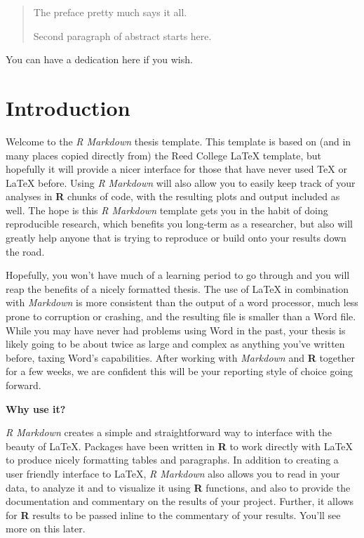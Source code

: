 \documentclass[12pt,twoside]{reedthesis}
\begin{document}
  \listoftables

  \listoffigures
  \begin{abstract}
    The preface pretty much says it all.
    
    \par
    
    Second paragraph of abstract starts here.
  \end{abstract}
  \begin{dedication}
    You can have a dedication here if you wish.
  \end{dedication}
\mainmatter %
\pagestyle{fancyplain} %

\hypertarget{introduction}{%
\chapter*{Introduction}\label{introduction}}

Welcome to the \emph{R Markdown} thesis template. This template is based on (and in many places copied directly from) the Reed College LaTeX template, but hopefully it will provide a nicer interface for those that have never used TeX or LaTeX before. Using \emph{R Markdown} will also allow you to easily keep track of your analyses in \textbf{R} chunks of code, with the resulting plots and output included as well. The hope is this \emph{R Markdown} template gets you in the habit of doing reproducible research, which benefits you long-term as a researcher, but also will greatly help anyone that is trying to reproduce or build onto your results down the road.

Hopefully, you won't have much of a learning period to go through and you will reap the benefits of a nicely formatted thesis. The use of LaTeX in combination with \emph{Markdown} is more consistent than the output of a word processor, much less prone to corruption or crashing, and the resulting file is smaller than a Word file. While you may have never had problems using Word in the past, your thesis is likely going to be about twice as large and complex as anything you've written before, taxing Word's capabilities. After working with \emph{Markdown} and \textbf{R} together for a few weeks, we are confident this will be your reporting style of choice going forward.

\textbf{Why use it?}

\emph{R Markdown} creates a simple and straightforward way to interface with the beauty of LaTeX. Packages have been written in \textbf{R} to work directly with LaTeX to produce nicely formatting tables and paragraphs. In addition to creating a user friendly interface to LaTeX, \emph{R Markdown} also allows you to read in your data, to analyze it and to visualize it using \textbf{R} functions, and also to provide the documentation and commentary on the results of your project. Further, it allows for \textbf{R} results to be passed inline to the commentary of your results. You'll see more on this later.
\end{document}
